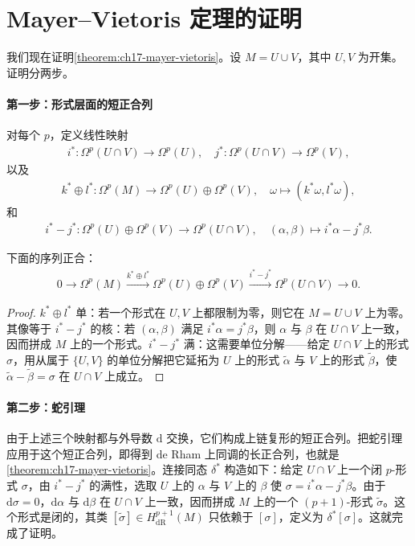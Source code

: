 \documentclass[../../main.tex]{subfiles}
\begin{document}
\section{Mayer--Vietoris 定理的证明}\label{section:ch17-proof-of-the-mayer-vietoris-theorem}

我们现在证明\cref{theorem:ch17-mayer-vietoris}。设 $M=U\cup V$，其中 $U,V$ 为开集。证明分两步。

\paragraph{第一步：形式层面的短正合列}
对每个 $p$，定义线性映射
\begin{align*}
i^*:\Omega^p(U\cap V)\to\Omega^p(U),\quad j^*:\Omega^p(U\cap V)\to\Omega^p(V),
\end{align*}
以及
\begin{align*}
k^*\oplus l^*:\Omega^p(M)\to\Omega^p(U)\oplus\Omega^p(V),\quad \omega\mapsto(k^*\omega,l^*\omega),
\end{align*}
和
\begin{align*}
i^*-j^*:\Omega^p(U)\oplus\Omega^p(V)\to\Omega^p(U\cap V),\quad(\alpha,\beta)\mapsto i^*\alpha-j^*\beta.
\end{align*}

\begin{proposition}\label{proposition:ch17-short-exact-sequence}
下面的序列正合：
\begin{align*}
0\to\Omega^p(M)\xrightarrow{k^*\oplus l^*}\Omega^p(U)\oplus\Omega^p(V)\xrightarrow{i^*-j^*}\Omega^p(U\cap V)\to0.
\end{align*}
\end{proposition}

\begin{proof}
$k^*\oplus l^*$ 单：若一个形式在 $U,V$ 上都限制为零，则它在 $M=U\cup V$ 上为零。其像等于 $i^*-j^*$ 的核：若 $(\alpha,\beta)$ 满足 $i^*\alpha=j^*\beta$，则 $\alpha$ 与 $\beta$ 在 $U\cap V$ 上一致，因而拼成 $M$ 上的一个形式。$i^*-j^*$ 满：这需要单位分解——给定 $U\cap V$ 上的形式 $\sigma$，用从属于 $\{U,V\}$ 的单位分解把它延拓为 $U$ 上的形式 $\widetilde\alpha$ 与 $V$ 上的形式 $\widetilde\beta$，使 $\widetilde\alpha-\widetilde\beta=\sigma$ 在 $U\cap V$ 上成立。
\end{proof}

\paragraph{第二步：蛇引理}
由于上述三个映射都与外导数 $\mathrm{d}$ 交换，它们构成上链复形的短正合列。把蛇引理应用于这个短正合列，即得到 de Rham 上同调的长正合列，也就是\cref{theorem:ch17-mayer-vietoris}。连接同态 $\delta^*$ 构造如下：给定 $U\cap V$ 上一个闭 $p$-形式 $\sigma$，由 $i^*-j^*$ 的满性，选取 $U$ 上的 $\alpha$ 与 $V$ 上的 $\beta$ 使 $\sigma=i^*\alpha-j^*\beta$。由于 $\mathrm{d}\sigma=0$，$\mathrm{d}\alpha$ 与 $\mathrm{d}\beta$ 在 $U\cap V$ 上一致，因而拼成 $M$ 上的一个 $(p+1)$-形式 $\widetilde\sigma$。这个形式是闭的，其类 $[\widetilde\sigma]\in H^{p+1}_{\mathrm{dR}}(M)$ 只依赖于 $[\sigma]$，定义为 $\delta^*[\sigma]$。这就完成了证明。
\end{document}
